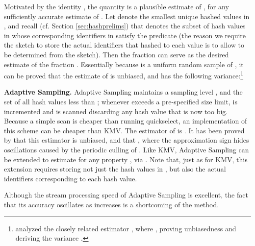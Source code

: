 \documentclass{article}
\begin{document}
Motivated by the identity , the quantity  is a plausible
estimate of , for any sufficiently accurate estimate   of .
Let  denote the  smallest unique hashed values in , and recall (cf. Section \ref{sec:hashprelims}) that  denotes
the subset of hash values in  whose corresponding identifiers in  satisfy the predicate  (the reason we require
the sketch to store the actual identifiers that hashed to each value is to allow  to be determined from the sketch). 
Then the fraction  can serve as the desired estimate of the fraction . 
Essentially because  is a uniform random sample of , it can be proved
that the estimate  of  
is unbiased, and has the following variance:\footnote{\cite{beyer2009distinct} analyzed the closely related estimator
, where ,
proving unbiasedness and 
deriving the variance .}






\medskip \noindent \textbf{Adaptive Sampling.}\label{subsubAdapt}
Adaptive Sampling maintains a sampling level , and the set 
of all hash values less than ; whenever  exceeds a pre-specified
size limit,  is incremented and  is scanned discarding any hash value
that is now too big. Because a simple scan is cheaper than running
quickselect, an implementation of this scheme can be cheaper than
KMV. The estimator of  is . It has been proved by \cite{flajolet1990adaptive} that this
estimator is unbiased, and that , where the approximation sign hides oscillations caused
by the periodic culling of .  
Like KMV, Adaptive Sampling can be extended to estimate  for any property , via 
. Note that, just as for KMV, this extension requires storing not just the hash values in ,
but also the actual identifiers corresponding to each hash value.

Although the stream processing speed of Adaptive Sampling is excellent, the fact that its accuracy oscillates as  increases is a shortcoming of the method. 
\end{document}
